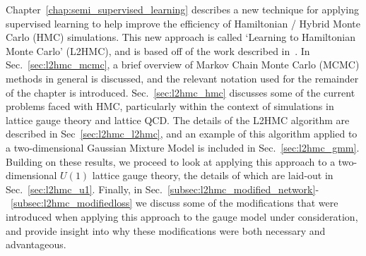 \documentclass[../main.tex]{subfiles}
\begin{document}
Chapter~\ref{chap:semi_supervised_learning} describes a new technique for applying supervised learning to help improve
the efficiency of Hamiltonian / Hybrid Monte Carlo (HMC) simulations.
%
This new approach is called `Learning to Hamiltonian Monte Carlo' (L2HMC), and is based off of the work described
in~\cite{2017arXiv171109268L}.
%
In Sec.~\ref{sec:l2hmc_mcmc}, a brief overview of Markov Chain Monte Carlo (MCMC) methods in general is discussed, and
the relevant notation used for the remainder of the chapter is introduced.
%
Sec.~\ref{sec:l2hmc_hmc} discusses some of the current problems faced with HMC, particularly within the context of
simulations in lattice gauge theory and lattice QCD.
%
The details of the L2HMC algorithm are described in Sec~\ref{sec:l2hmc_l2hmc}, and an example of this algorithm applied
to a two-dimensional Gaussian Mixture Model is included in Sec.~\ref{sec:l2hmc_gmm}.
%
Building on these results, we proceed to look at applying this approach to a two-dimensional $U(1)$ lattice gauge
theory, the details of which are laid-out in Sec.~\ref{sec:l2hmc_u1}.
%
Finally, in Sec.~\ref{subsec:l2hmc_modified_network}-~\ref{subsec:l2hmc_modifiedloss} we discuss some
of the modifications that were introduced when applying this approach to the gauge model under consideration, and
provide insight into why these modifications were both necessary and advantageous.
\end{document}
